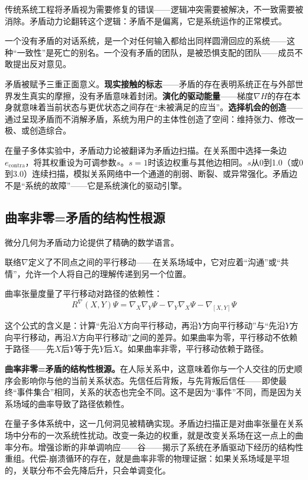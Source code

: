 \documentclass[11pt,a4paper]{book}
\theoremstyle{definition}
\begin{document}
传统系统工程将矛盾视为需要修复的错误——逻辑冲突需要被解决，不一致需要被消除。矛盾动力论翻转这个逻辑：矛盾不是偏离，它是系统运作的正常模式。

一个没有矛盾的对话系统，是一个对任何输入都给出同样圆滑回应的系统——这种“一致性”是死亡的别名。一个没有矛盾的团队，是被恐惧支配的团队——成员不敢提出反对意见。

矛盾被赋予三重正面意义。\textbf{现实接触的标志}——矛盾的存在表明系统正在与外部世界发生真实的摩擦，没有矛盾意味着封闭。\textbf{演化的驱动能量}——梯度$\nabla H$的存在本身就意味着当前状态与更优状态之间存在“未被满足的应当”。\textbf{选择机会的创造}——通过呈现矛盾而不消解矛盾，系统为用户的主体性创造了空间：维持张力、修改一极、或创造综合。

在量子多体实验中，矛盾动力论被翻译为矛盾边扫描。在关系图中选择一条边$e_{\text{contra}}$，将其权重设为可调参数$s$。$s=1$时该边权重与其他边相同。$s$从0到1.0（或0到3.0）连续扫描，模拟关系网络中一个通道的削弱、断裂、或异常强化。矛盾边不是“系统的故障”——它是系统演化的驱动引擎。

\subsection{曲率非零=矛盾的结构性根源}

微分几何为矛盾动力论提供了精确的数学语言。

联络$\nabla$定义了不同点之间的平行移动——在关系场域中，它对应着“沟通”或“共情”，允许一个人将自己的理解传递到另一个位置。

曲率张量度量了平行移动对路径的依赖性：
\begin{equation}
R^\nabla(X, Y)\Psi = \nabla_X \nabla_Y \Psi - \nabla_Y \nabla_X \Psi - \nabla_{[X, Y]}\Psi
\end{equation}

这个公式的含义是：计算“先沿$X$方向平行移动，再沿$Y$方向平行移动”与“先沿$Y$方向平行移动，再沿$X$方向平行移动”之间的差异。如果曲率为零，平行移动不依赖于路径——先$X$后$Y$等于先$Y$后$X$。如果曲率非零，平行移动依赖于路径。

\textbf{曲率非零=矛盾的结构性根源。}在人际关系中，这意味着你与一个人交往的历史顺序会影响你与他的当前关系状态。先信任后背叛，与先背叛后信任——即使最终“事件集合”相同，关系的状态也完全不同。这不是因为“事件”不同，而是因为关系场域的曲率导致了路径依赖性。

在量子多体系统中，这一几何洞见被精确实现。矛盾边扫描正是对曲率张量在关系场中分布的一次系统性扰动。改变一条边的权重，就是改变关系场在这一点上的曲率分布。增强诊断的非单调响应——谷——揭示了系统在矛盾驱动下经历的结构性重组。代偿-崩溃循环的存在，就是曲率非零的物理证据：如果关系场域是平坦的，关联分布不会先降后升，只会单调变化。
\end{document}

